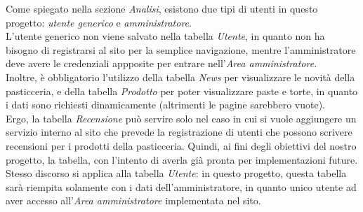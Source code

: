 Come spiegato nella sezione \emph{Analisi}, esistono due tipi di utenti in questo progetto: \emph{utente generico} e \emph{amministratore}.\\ L'utente generico non viene salvato nella tabella \emph{Utente}, in quanto non ha bisogno di registrarsi al sito per la semplice navigazione, mentre l'amministratore deve avere le credenziali appposite per entrare nell'\emph{Area amministratore}.\\
Inoltre, è obbligatorio l'utilizzo della tabella \emph{News} per visualizzare le novità della pasticceria, e della tabella \emph{Prodotto} per poter visualizzare paste e torte, in quanto i dati sono richiesti dinamicamente (altrimenti le pagine sarebbero vuote).\\
Ergo, la tabella \emph{Recensione} può servire solo nel caso in cui si vuole aggiungere un servizio interno al sito che prevede la registrazione di utenti che possono scrivere recensioni per i prodotti della pasticceria. Quindi, ai fini degli obiettivi del nostro progetto, la tabella, con l'intento di averla già pronta per implementazioni future.\\
Stesso discorso si applica alla tabella \emph{Utente}: in questo progetto, questa tabella sarà riempita solamente con i dati dell'amministratore, in quanto unico utente ad aver accesso all'\emph{Area amministratore} implementata nel sito.\\
